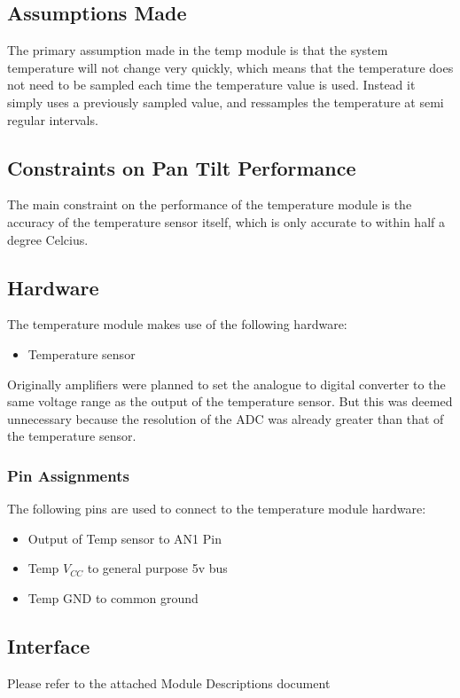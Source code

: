 \documentclass[]{report}
\begin{document}
\subsection{Assumptions Made}
The primary assumption made in the temp module is that the system temperature will not change very quickly, which means that the temperature does not need to be sampled each time the temperature value is used. Instead it simply uses a previously sampled value, and ressamples the temperature at semi regular intervals.

\subsection{Constraints on Pan Tilt Performance}
The main constraint on the performance of the temperature module is the accuracy of the temperature sensor itself, which is only accurate to within half a degree Celcius. 

\subsection{Hardware}
The temperature module makes use of the following hardware:
\begin{itemize}
	\item Temperature sensor
\end{itemize}
Originally amplifiers were planned to set the analogue to digital converter to the same voltage range as the output of the temperature sensor. But this was deemed unnecessary because the resolution of the ADC was already greater than that of the temperature sensor.

\subsubsection{Pin Assignments}
The following pins are used to connect to the temperature module hardware:
\begin{itemize}
	\item Output of Temp sensor to AN1 Pin
	\item Temp $V_{CC}$ to general purpose 5v bus
	\item Temp GND to common ground
\end{itemize}

\subsection{Interface}
Please refer to the attached Module Descriptions document
\end{document}
